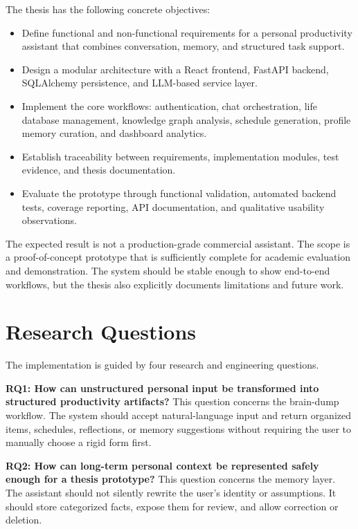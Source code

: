 The thesis has the following concrete objectives:

\begin{itemize}
  \item Define functional and non-functional requirements for a personal productivity assistant that combines conversation, memory, and structured task support.
  \item Design a modular architecture with a React frontend, FastAPI backend, SQLAlchemy persistence, and LLM-based service layer.
  \item Implement the core workflows: authentication, chat orchestration, life database management, knowledge graph analysis, schedule generation, profile memory curation, and dashboard analytics.
  \item Establish traceability between requirements, implementation modules, test evidence, and thesis documentation.
  \item Evaluate the prototype through functional validation, automated backend tests, coverage reporting, API documentation, and qualitative usability observations.
\end{itemize}

The expected result is not a production-grade commercial assistant. The scope is a proof-of-concept prototype that is sufficiently complete for academic evaluation and demonstration. The system should be stable enough to show end-to-end workflows, but the thesis also explicitly documents limitations and future work.

\section{Research Questions}

The implementation is guided by four research and engineering questions.

\textbf{RQ1: How can unstructured personal input be transformed into structured productivity artifacts?} This question concerns the brain-dump workflow. The system should accept natural-language input and return organized items, schedules, reflections, or memory suggestions without requiring the user to manually choose a rigid form first.

\textbf{RQ2: How can long-term personal context be represented safely enough for a thesis prototype?} This question concerns the memory layer. The assistant should not silently rewrite the user's identity or assumptions. It should store categorized facts, expose them for review, and allow correction or deletion.

